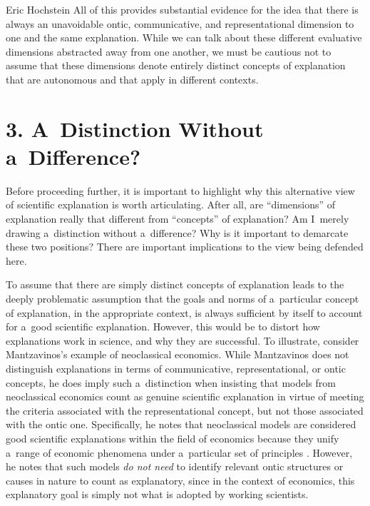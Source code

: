 \begin{artengenv}{Eric Hochstein}
All of this provides substantial evidence for the idea that there is always an unavoidable ontic, communicative, and representational dimension to one and the same explanation. While we can talk about these different evaluative dimensions abstracted away from one another, we must be cautious not to assume that these dimensions denote entirely distinct concepts of explanation that are autonomous and that apply in different contexts.

\section*{3. A~Distinction Without a~Difference?}
Before proceeding further, it is important to highlight why this alternative view of scientific explanation is worth articulating. After all, are ``dimensions'' of explanation really that different from ``concepts'' of explanation? Am I~merely drawing a~distinction without a~difference? Why is it important to demarcate these two positions? There are important implications to the view being defended here.

To assume that there are simply distinct concepts of explanation leads to the deeply problematic assumption that the goals and norms of a~particular concept of explanation, in the appropriate context, is always sufficient by itself to account for a~good scientific explanation. However, this would be to distort how explanations work in science, and why they are successful. To illustrate, consider Mantzavinos's example of neoclassical economics. While Mantzavinos does not distinguish explanations in terms of communicative, representational, or ontic concepts, he does imply such a~distinction when insisting that models from neoclassical economics count as genuine scientific explanation in virtue of meeting the criteria associated with the representational concept, but not those associated with the ontic one. Specifically, he notes that neoclassical models are considered good scientific explanations within the field of economics because they unify a~range of economic phenomena under a~particular set of principles
\parencite[][p.12]{mantzavinos_explanatory_2016}. %
 However, he notes that such models \textit{do not need} to identify relevant ontic structures or causes in nature to count as explanatory, since in the context of economics, this explanatory goal is simply not what is adopted by working scientists.


\end{artengenv}
